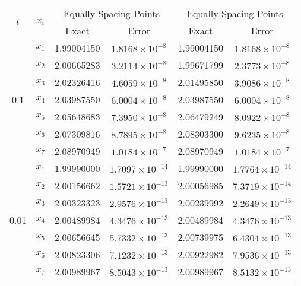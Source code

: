 \documentclass[12pt, a4paper]{article}
\begin{document}
\begin{table}[ht]
	\renewcommand{\arraystretch}{1.5}
	\centering
	\begin{tabular}{|c|c|c|c|c|c|}
		\hline
		\multirow{2}{*}{\( t \)} & \multirow{2}{*}{\( x_i \)} & \multicolumn{2}{c|}{Equally Spacing Points} & \multicolumn{2}{c|}{Equally Spacing Points} \\
		\cline{3-6}
		& & Exact & Error & Exact & Error \\
		\hline
		\multirow{7}{*}{0.1} & \( x_1 \) & 1.99004150 & \( 1.8168 \times 10^{-8} \) & 1.99004150 & \( 1.8168 \times 10^{-8} \) \\
		& \( x_2 \) & 2.00665283 & \( 3.2114 \times 10^{-8} \) & 1.99671799 & \( 2.3773 \times 10^{-8} \) \\
		& \( x_3 \) & 2.02326416 & \( 4.6059 \times 10^{-8} \) & 2.01495850 & \( 3.9086 \times 10^{-8} \) \\
		& \( x_4 \) & 2.03987550 & \( 6.0004 \times 10^{-8} \) & 2.03987550 & \( 6.0004 \times 10^{-8} \) \\
		& \( x_5 \) & 2.05648683 & \( 7.3950 \times 10^{-8} \) & 2.06479249 & \( 8.0922 \times 10^{-8} \) \\
		& \( x_6 \) & 2.07309816 & \( 8.7895 \times 10^{-8} \) & 2.08303300 & \( 9.6235 \times 10^{-8} \) \\
		& \( x_7 \) & 2.08970949 & \( 1.0184 \times 10^{-7} \) & 2.08970949 & \( 1.0184 \times 10^{-7} \) \\
		\hline
		\multirow{7}{*}{0.01} & \( x_1 \) & 1.99990000 & \( 1.7097 \times 10^{-14} \) & 1.99990000 & \( 1.7764 \times 10^{-14} \) \\
		& \( x_2 \) & 2.00156662 & \( 1.5721 \times 10^{-13} \) & 2.00056985 & \( 7.3719 \times 10^{-14} \) \\
		& \( x_3 \) & 2.00323323 & \( 2.9576 \times 10^{-13} \) & 2.00239992 & \( 2.2649 \times 10^{-13} \) \\
		& \( x_4 \) & 2.00489984 & \( 4.3476 \times 10^{-13} \) & 2.00489984 & \( 4.3476 \times 10^{-13} \) \\
		& \( x_5 \) & 2.00656645 & \( 5.7332 \times 10^{-13} \) & 2.00739975 & \( 6.4304 \times 10^{-13} \) \\
		& \( x_6 \) & 2.00823306 & \( 7.1232 \times 10^{-13} \) & 2.00922982 & \( 7.9536 \times 10^{-13} \) \\
		& \( x_7 \) & 2.00989967 & \( 8.5043 \times 10^{-13} \) & 2.00989967 & \( 8.5132 \times 10^{-13} \) \\
		\hline
	\end{tabular}
\end{table}
\end{document}
